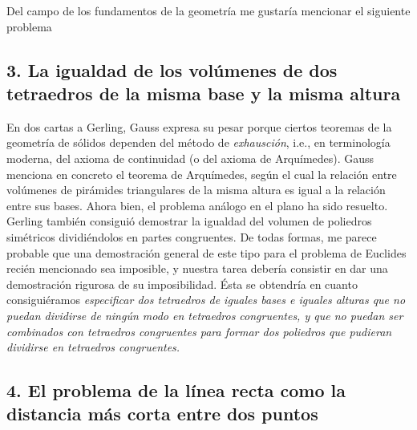\documentclass[a4paper, 12pt]{article}
\begin{document}
Del campo de los fundamentos de la geometría me gustaría mencionar el siguiente problema


\subsection*{3. La igualdad de los volúmenes de dos tetraedros de la misma base y la misma altura}

 
En dos cartas a Gerling, Gauss expresa su pesar porque ciertos teoremas de la geometría de sólidos dependen del método de \textit{exhausción}, i.e., en terminología moderna, del axioma de continuidad (o del axioma de Arquímedes). Gauss menciona en concreto el teorema de Arquímedes, según el cual la relación entre volúmenes de pirámides triangulares de la misma altura es igual a la relación entre sus bases. Ahora bien, el problema análogo en el plano ha sido resuelto. Gerling también consiguió demostrar la igualdad del volumen de poliedros simétricos dividiéndolos en partes congruentes. De todas formas, me parece probable que una demostración general de este tipo para el problema de Euclides recién mencionado sea imposible, y nuestra tarea debería consistir en dar una demostración rigurosa de su imposibilidad. Ésta se obtendría en cuanto consiguiéramos \textit{especificar dos tetraedros de iguales bases e iguales alturas que no puedan dividirse de ningún modo en tetraedros congruentes, y que no puedan ser combinados con tetraedros congruentes para formar dos poliedros que pudieran dividirse en tetraedros congruentes.}

\subsection*{4. El problema de la línea recta como la distancia más corta entre dos puntos}
 
\end{document}
